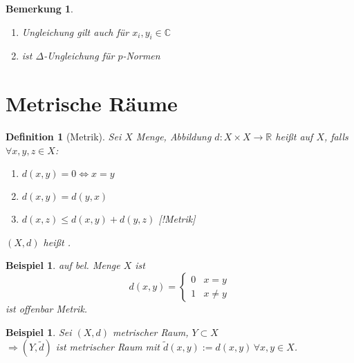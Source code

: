 \documentclass[ngerman,a4paper]{report}
\theoremstyle{break}
\newtheorem{example}[theorem]{Beispiel}
\newtheorem*{definition}{Definition}
\newtheorem{remark}[theorem]{Bemerkung}
\begin{document}
\begin{remark}
	\begin{enumerate}[label={\arabic*)}]
    \item Ungleichung gilt auch für $x_i, y_i \in \mathbb{C}$
    \item ist $\Delta$-Ungleichung für $p$-Normen
    \end{enumerate}
\end{remark}

\section{Metrische Räume}
\begin{definition}[Metrik]
	Sei $X$ Menge, Abbildung $d:X\times X\rightarrow \mathbb{R}$ heißt  auf $X$, falls $\forall x,y,z\in X$:
	\begin{enumerate}[label={\alph*)}]
		\item $d(x,y) = 0 \Leftrightarrow x=y$
		\item $d(x,y) = d(y,x)$ 
		\item $d(x,z)\le d(x,y) + d(y,z)$ [!Metrik]
	\end{enumerate}

	$(X,d)$ heißt .
\end{definition}
\begin{example}
	 auf bel. Menge $X$ ist \[ d(x,y) = \begin{cases}0& x=y \\ 1 & x\neq y \end{cases} \] ist offenbar Metrik.
\end{example}
\begin{example}
	Sei $(X,d)$ metrischer Raum, $Y\subset X$\\
	$\Rightarrow (Y,\tilde{d})$ ist metrischer Raum mit  $\tilde{d}(x,y) := d(x,y)\,\forall x,y\in X$.
\end{example}
\end{document}
